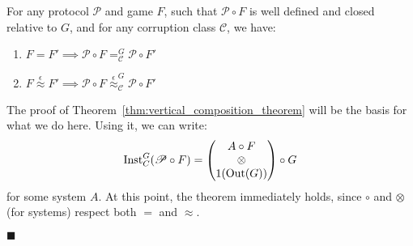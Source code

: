 \begin{theorem}
  For any protocol $\mathscr{P}$ and game $F$, such that $\mathscr{P} \circ F$
  is well defined and closed relative to $G$, and for any corruption class $\mathscr{C}$, we have:
  \begin{enumerate}
    \item $F = F' \implies \mathscr{P} \circ F =^G_{\mathscr{C}} \mathscr{P} \circ F'$
    \item $F \overset{\epsilon}{\approx} F' \implies \mathscr{P} \circ F \overset{\epsilon}{\approx}^G_{\mathscr{C}} \mathscr{P} \circ F'$
  \end{enumerate}

   The proof of Theorem~\ref{thm:vertical_composition_theorem} will be the basis
  for what we do here.
  Using it, we can write:
  $$
  \text{Inst}^G_C(\mathscr{P} \circ F) =
  \begin{pmatrix}
    A \circ F\cr
    \otimes\cr
    1(\text{Out}(G))
  \end{pmatrix}
  \circ G
  $$
  for some system $A$.
  At this point, the theorem immediately holds, since $\circ$ and $\otimes$ (for systems)
  respect both $=$ and $\approx$.

  $\blacksquare$
\end{theorem}

